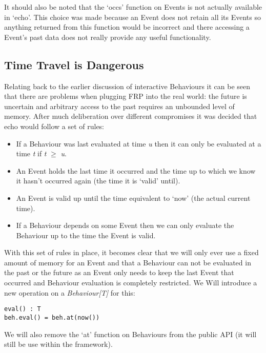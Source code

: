       It should also be noted that the `occs' function on Events is not actually available in `echo'. This
      choice was made because an Event does not retain all its Events so anything returned from this 
      function would be incorrect and there accessing a Event's past data does not really
      provide any useful functionality.

    \subsection{Time Travel is Dangerous}
      Relating back to the earlier discussion of interactive Behaviours it can be seen
      that there are problems when plugging FRP into the real world: the future is uncertain and
      arbitrary access to the past requires an unbounded level of memory. After much deliberation
      over different compromises it was decided that echo would follow a set of rules:
      
      \begin{itemize}
        \item If a Behaviour was last evaluated at time \emph{u} then it can only be evaluated at
        a time \emph{t} if \emph{t} $\geq$ \emph{u}.
        \item An Event holds the last time it occurred and the time up to which we know it hasn't occurred
        again (the time it is `valid' until).
        \item An Event is valid up until the time equivalent to `now' (the actual current time).
        \item If a Behaviour depends on some Event then we can only evaluate the Behaviour up to
        the time the Event is valid.
      \end{itemize}
      
      With this set of rules in place, it becomes clear that we will only ever use a fixed amount of memory
      for an Event and that a Behaviour can not be evaluated in the past or the future as an Event
      only needs to keep the last Event that occurred and Behaviour evaluation is completely restricted. We Will
      introduce a new operation on a \emph{Behaviour[T]} for this:

\begin{verbatim}
eval() : T
beh.eval() = beh.at(now())
\end{verbatim}       

      We will also remove the `at' function on Behaviours from the public API (it will still be
      use within the framework). 
      
